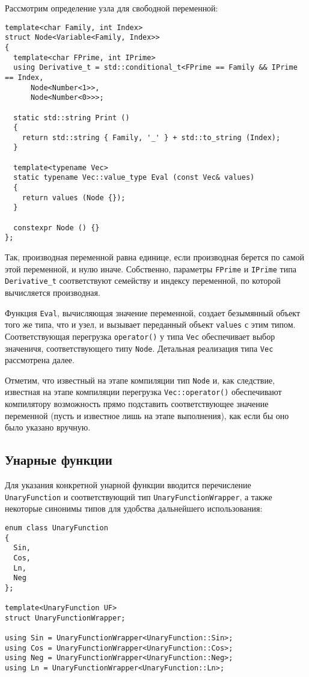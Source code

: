 \documentclass[11pt,a4paper]{article}
\begin{document}
Рассмотрим определение узла для свободной переменной:
\begin{lstlisting}
template<char Family, int Index>
struct Node<Variable<Family, Index>>
{
  template<char FPrime, int IPrime>
  using Derivative_t = std::conditional_t<FPrime == Family && IPrime == Index,
      Node<Number<1>>,
      Node<Number<0>>>;

  static std::string Print ()
  {
    return std::string { Family, '_' } + std::to_string (Index);
  }

  template<typename Vec>
  static typename Vec::value_type Eval (const Vec& values)
  {
    return values (Node {});
  }

  constexpr Node () {}
};
\end{lstlisting}

Так, производная переменной равна единице, если производная берется по самой этой переменной,
и нулю иначе. Собственно, параметры \texttt{FPrime} и \texttt{IPrime} типа \texttt{Derivative\_t}
соответствуют семейству и индексу переменной, по которой вычисляется производная.

Функция \texttt{Eval}, вычисляющая значение переменной, создает безымянный объект того же типа,
что и узел, и вызывает переданный объект \texttt{values} с этим типом. Соответствующая перегрузка
\texttt{operator()} у типа \texttt{Vec} обеспечивает выбор значеничя, соответствующего типу
\texttt{Node}. Детальная реализация типа \texttt{Vec} рассмотрена далее.

Отметим, что известный на этапе компиляции тип \texttt{Node} и, как следствие, известная на этапе
компиляции перегрузка \texttt{Vec::operator()} обеспечивают компилятору возможность прямо подставить
соответствующее значение переменной (пусть и известное лишь на этапе выполнения), как если бы оно
было указано вручную.

\subsection{Унарные функции}

Для указания конкретной унарной функции вводится перечисление \texttt{UnaryFunction} и
соответствующий тип \texttt{UnaryFunctionWrapper}, а также некоторые синонимы типов для удобства
дальнейшего использования:
\begin{lstlisting}
enum class UnaryFunction
{
  Sin,
  Cos,
  Ln,
  Neg
};

template<UnaryFunction UF>
struct UnaryFunctionWrapper;

using Sin = UnaryFunctionWrapper<UnaryFunction::Sin>;
using Cos = UnaryFunctionWrapper<UnaryFunction::Cos>;
using Neg = UnaryFunctionWrapper<UnaryFunction::Neg>;
using Ln = UnaryFunctionWrapper<UnaryFunction::Ln>;
\end{lstlisting}
\end{document}
